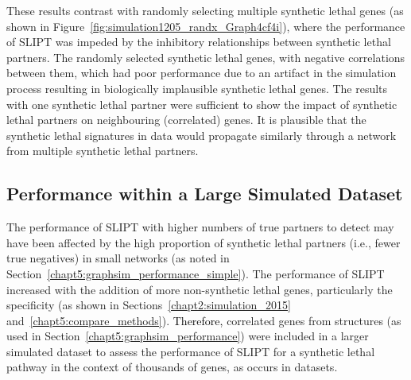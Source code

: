 These results contrast with randomly selecting multiple \gls{synthetic lethal} genes (as shown in Figure~\ref{fig:simulation1205_randx_Graph4cf4i}), where the performance of \gls{SLIPT} was impeded by the inhibitory relationships between \gls{synthetic lethal} partners. The randomly selected \gls{synthetic lethal} genes, with negative correlations between them, which had poor performance due to an artifact in the simulation process resulting in biologically implausible \gls{synthetic lethal} genes.
%
The results with one \gls{synthetic lethal} partner were sufficient to show the impact of \gls{synthetic lethal} partners on neighbouring (correlated) genes. It is plausible that the \gls{synthetic lethal} signatures in  data would propagate similarly through a network from multiple \gls{synthetic lethal} partners. %

\FloatBarrier

\subsection{Performance within a Large Simulated Dataset}
\label{chapt5:graphsim_performance_20K}

\FloatBarrier

The performance of \gls{SLIPT} with higher numbers of true partners to detect may have been affected by the high proportion of \gls{synthetic lethal} partners (i.e., fewer true negatives) in small networks (as noted in Section~\ref{chapt5:graphsim_performance_simple}). 
The performance of \gls{SLIPT} increased with the addition of more non-synthetic lethal genes, particularly the specificity (as shown in Sections~\ref{chapt2:simulation_2015} and~\ref{chapt5:compare_methods}). 
\textcolor{black}{Therefore,} correlated genes from  structures (as used in Section~\ref{chapt5:graphsim_performance}) were included in a larger simulated dataset to assess the performance of \gls{SLIPT} for a \gls{synthetic lethal} pathway in the context of thousands of genes, as occurs in  datasets. 

